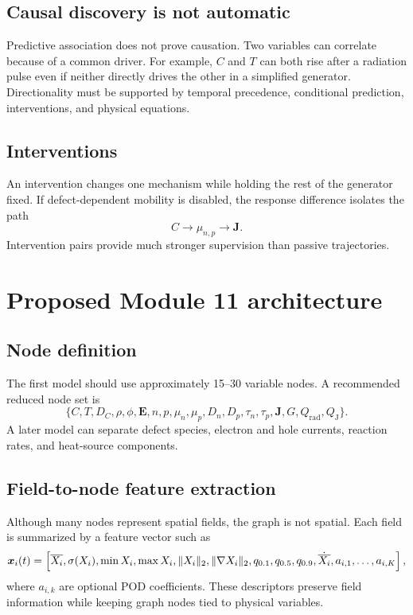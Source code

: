 \documentclass[11pt]{article}
\newcommand{\Evec}{\bm{E}}
\newcommand{\Jvec}{\bm{J}}
\begin{document}
\subsection{Causal discovery is not automatic}

Predictive association does not prove causation. Two variables can correlate because of a common driver. For example, \(C\) and \(T\) can both rise after a radiation pulse even if neither directly drives the other in a simplified generator. Directionality must be supported by temporal precedence, conditional prediction, interventions, and physical equations.

\subsection{Interventions}

An intervention changes one mechanism while holding the rest of the generator fixed. If defect-dependent mobility is disabled, the response difference isolates the path
\begin{equation}
C\rightarrow\mu_{n,p}\rightarrow\Jvec.
\end{equation}
Intervention pairs provide much stronger supervision than passive trajectories.

\section{Proposed Module 11 architecture}

\subsection{Node definition}

The first model should use approximately 15--30 variable nodes. A recommended reduced node set is
\begin{equation}
\{C,T,D_C,\rho,\phi,\Evec,n,p,\mu_n,\mu_p,D_n,D_p,\tau_n,\tau_p,\Jvec,G,Q_{\mathrm{rad}},Q_{\mathrm{J}}\}.
\end{equation}
A later model can separate defect species, electron and hole currents, reaction rates, and heat-source components.

\subsection{Field-to-node feature extraction}

Although many nodes represent spatial fields, the graph is not spatial. Each field is summarized by a feature vector such as
\begin{equation}
\bm{x}_i(t)=\left[
\overline{X_i},
\sigma(X_i),
\min X_i,
\max X_i,
\|X_i\|_2,
\|\nabla X_i\|_2,
q_{0.1},q_{0.5},q_{0.9},
\dot{\overline{X_i}},
a_{i,1},\ldots,a_{i,K}
\right],
\end{equation}
where \(a_{i,k}\) are optional POD coefficients. These descriptors preserve field information while keeping graph nodes tied to physical variables.
\end{document}
